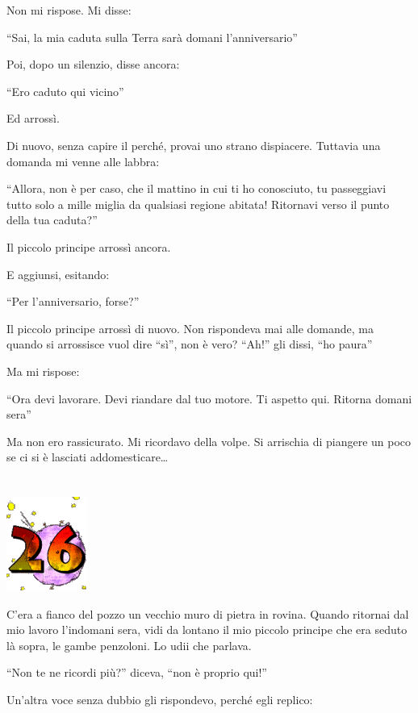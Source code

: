 \documentclass[11pt]{scrbook}
\begin{document}
Non mi rispose. Mi disse:

``Sai, la mia caduta sulla Terra sarà domani l'anniversario''

Poi, dopo un silenzio, disse ancora:

``Ero caduto qui vicino''

Ed arrossì.

Di nuovo, senza capire il perché, provai uno strano dispiacere. Tuttavia una domanda mi venne alle labbra:

``Allora, non è per caso, che il mattino in cui ti ho conosciuto, tu passeggiavi tutto solo a mille miglia da qualsiasi regione abitata! Ritornavi verso il punto della tua caduta?''

Il piccolo principe arrossì ancora.

E aggiunsi, esitando:

``Per l'anniversario, forse?''

Il piccolo principe arrossì di nuovo. Non rispondeva mai alle domande, ma quando si arrossisce vuol dire ``sì'', non è vero? ``Ah!'' gli dissi, ``ho paura''

Ma mi rispose:

``Ora devi lavorare. Devi riandare dal tuo motore. Ti aspetto qui. Ritorna domani sera''

Ma non ero rassicurato. Mi ricordavo della volpe. Si arrischia di piangere un poco se ci si è lasciati addomesticare\ldots{}

\chapter{}
\begin{center}
\includegraphics{img/chapter26}
\end{center}

C'era a fianco del pozzo un vecchio muro di pietra in rovina. Quando ritornai dal mio lavoro l'indomani sera, vidi da lontano il mio piccolo principe che era seduto là sopra, le gambe penzoloni. Lo udii che parlava.

``Non te ne ricordi più?'' diceva, ``non è proprio qui!''

Un'altra voce senza dubbio gli rispondevo, perché egli replico:
\end{document}
